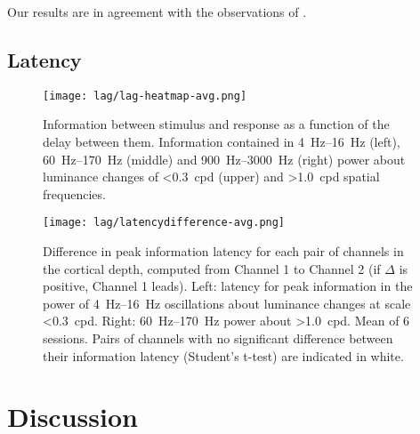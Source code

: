 Our results are in agreement with the observations of \citet[Figure 5B]{Maier2010}.

\subsection{Latency}

\begin{figure}[htb]
    \centering
    \texttt{[image: lag/lag-heatmap-avg.png]}
    \caption{
Information between stimulus and response as a function of the delay between them.
Information contained in \SIrange{4}{16}{Hz} (left), \SIrange{60}{170}{Hz} (middle) and \SIrange{900}{3000}{Hz} (right) power about luminance changes of \SI{<0.3}{cpd} (upper) and \SI{>1.0}{cpd} spatial frequencies.
}
\label{fig:lam_lag_hm}
\end{figure}


\begin{figure}[htb]
    \centering
    \hspace*{\fill}
    \hspace*{\fill}\hspace{.2cm}\hspace*{\fill}
    \hspace*{\fill}
    \caption{
}
\label{fig:lam_lag}
\end{figure}


\begin{figure}[htb]
    \centering
    \texttt{[image: lag/latencydifference-avg.png]}
    \caption{
Difference in peak information latency for each pair of channels in the cortical depth, computed from Channel 1 to Channel 2 (if $\Delta$ is positive, Channel 1 leads).
Left: latency for peak information in the power of \SIrange{4}{16}{Hz} oscillations about luminance changes at scale \SI{<0.3}{cpd}.
Right: \SIrange{60}{170}{Hz} power about \SI{>1.0}{cpd}.
Mean of 6 sessions.
Pairs of channels with no significant difference between their information latency (Student's t-test) are indicated in white.
}
\label{fig:lam_lag_dif}
\end{figure}


\section{Discussion}
